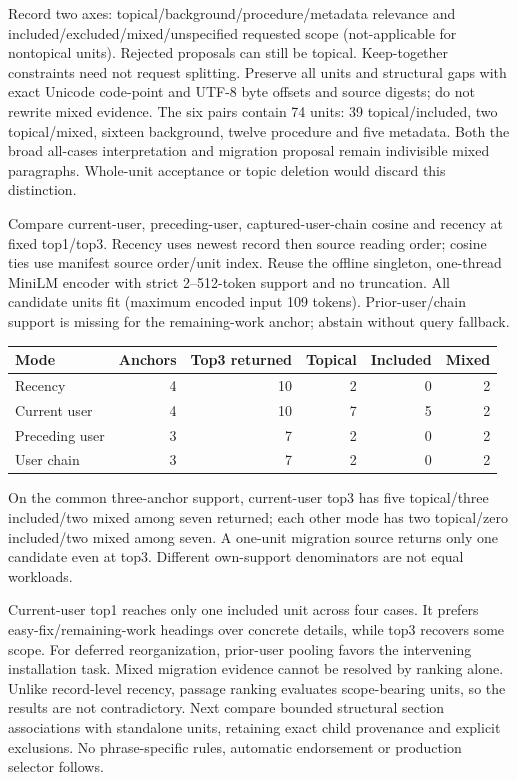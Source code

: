 \documentclass[11pt]{article}
\begin{document}
Record two axes: topical/background/procedure/metadata relevance and
included/excluded/mixed/unspecified requested scope (not-applicable for nontopical
units). Rejected proposals can still be topical. Keep-together constraints need not
request splitting. Preserve all units and structural gaps with exact Unicode
code-point and UTF-8 byte offsets and source digests; do not rewrite mixed evidence.
The six pairs contain 74 units: 39 topical/included, two topical/mixed, sixteen
background, twelve procedure and five metadata. Both the broad all-cases
interpretation and migration proposal remain indivisible mixed paragraphs.
Whole-unit acceptance or topic deletion would discard this distinction.

Compare current-user, preceding-user, captured-user-chain cosine and recency at
fixed top1/top3. Recency uses newest record then source reading order; cosine ties
use manifest source order/unit index. Reuse the offline singleton, one-thread
MiniLM encoder with strict 2--512-token support and no truncation. All candidate
units fit (maximum encoded input 109 tokens). Prior-user/chain support is missing
for the remaining-work anchor; abstain without query fallback.
\begin{center}
\begin{tabular}{lrrrrr}
\hline
Mode & Anchors & Top3 returned & Topical & Included & Mixed \\
\hline
Recency & 4 & 10 & 2 & 0 & 2 \\
Current user & 4 & 10 & 7 & 5 & 2 \\
Preceding user & 3 & 7 & 2 & 0 & 2 \\
User chain & 3 & 7 & 2 & 0 & 2 \\
\hline
\end{tabular}
\end{center}
On the common three-anchor support, current-user top3 has five topical/three
included/two mixed among seven returned; each other mode has two topical/zero
included/two mixed among seven. A one-unit migration source returns only one
candidate even at top3. Different own-support denominators are not equal workloads.

Current-user top1 reaches only one included unit across four cases. It prefers
easy-fix/remaining-work headings over concrete details, while top3 recovers some
scope. For deferred reorganization, prior-user pooling favors the intervening
installation task. Mixed migration evidence cannot be resolved by ranking alone.
Unlike record-level recency, passage ranking evaluates scope-bearing units, so the
results are not contradictory. Next compare bounded structural section associations
with standalone units, retaining exact child provenance and explicit exclusions.
No phrase-specific rules, automatic endorsement or production selector follows.
\end{document}
